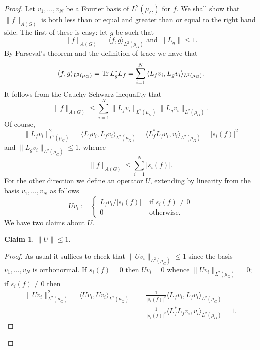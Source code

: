 \documentclass[12pt]{amsart}
\numberwithin{equation}{section}
\theoremstyle{plain}
\newtheorem*{claim}{Claim}
\theoremstyle{definition}
\renewcommand{\leq}{\leqslant}
\providecommand{\Tr}{\mathop{\rm Tr}\nolimits}
\begin{document}
\begin{proof}
Let $v_1,\dots,v_N$ be a Fourier basis of $L^2(\mu_G)$ for $f$. We shall show that $\|f\|_{A(G)}$ is both less than or equal and greater than or equal to the right hand side.  The first of these is easy: let $g$ be such that
\begin{equation*}
\|f\|_{A(G)}= \langle f,g\rangle_{L^2(\mu_G)} \textrm{ and } \|L_g\| \leq 1.
\end{equation*}
By Parseval's theorem and the definition of trace we have that
\begin{equation*}
\langle f,g\rangle_{L^2(\mu_G)} = \Tr L_g^*L_{f}=\sum_{i=1}^N{\langle L_fv_i,L_gv_i\rangle_{L^2(\mu_G)}}.
\end{equation*}
It follows from the Cauchy-Schwarz inequality that
\begin{equation*}
\|f\|_{A(G)} \leq \sum_{i=1}^N{\|L_fv_i\|_{L^2(\mu_G)}\|L_gv_i\|_{L^2(\mu_G)}}.
\end{equation*}
Of course,
\begin{equation*}
\|L_fv_i\|_{L^2(\mu_G)}^2 = \langle L_f v_i,L_fv_i\rangle_{L^2(\mu_G)} = \langle L_f^*L_fv_i,v_i\rangle_{L^2(\mu_G)} = |s_i(f)|^2
\end{equation*}
and $\|L_gv_i\|_{L^2(\mu_G)} \leq 1$, whence
\begin{equation*}
\|f\|_{A(G)} \leq \sum_{i=1}^N{|s_i(f)|}.
\end{equation*}
For the other direction we define an operator $U$, extending by linearity from the basis $v_1,\dots,v_N$ as follows
\begin{equation*}
Uv_i:=\begin{cases}L_fv_i/|s_i(f)| & \textrm{ if } s_i(f)\neq 0\\ 0 & \textrm{ otherwise.}\end{cases}
\end{equation*}
We have two claims about $U$.
\begin{claim}
$\|U\| \leq 1$.
\end{claim}
\begin{proof}
As usual it suffices to check that $\|Uv_i\|_{L^2(\mu_G)} \leq 1$ since the basis $v_1,\dots,v_N$ is orthonormal.  If $s_i(f)=0$ then $Uv_i=0$ whence $\|Uv_i\|_{L^2(\mu_G)} = 0$; if $s_i(f)\neq 0$ then
\begin{eqnarray*}
\|Uv_i\|_{L^2(\mu_G)}^2 = \langle Uv_i,Uv_i\rangle_{L^2(\mu_G)} &= &\frac{1}{|s_i(f)|^2}\langle L_fv_i,L_fv_i\rangle_{L^2(\mu_G)}\\ & = & \frac{1}{|s_i(f)|^2}\langle L_f^*L_fv_i,v_i\rangle_{L^2(\mu_G)}=1.

\end{eqnarray*}
\end{proof}
\end{proof}
\end{document}
